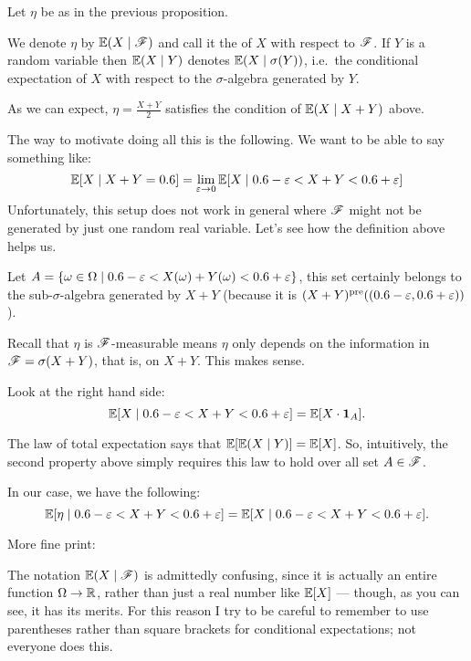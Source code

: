 \begin{definition}
	Let $\eta$ be as in the previous proposition.
	\begin{itemize}
		\ii We denote $\eta$ by $\mathbb E(X \mid \mathscr F)$
		and call it the  of $X$ with respect to $\mathscr F$.
		\ii If $Y$ is a random variable then
		$\mathbb E(X \mid Y)$ denotes $\mathbb E(X \mid \sigma(Y))$,
		i.e.\ the conditional expectation of $X$
		with respect to the $\sigma$-algebra generated by $Y$.
	\end{itemize}
\end{definition}

\begin{example}
	As we can expect, $\eta = \frac{X+Y}{2}$ satisfies the condition of $\mathbb E(X \mid X+Y)$ above.

	The way to motivate doing all this is the following. We want to be able to say
	something like:
	\[ \mathbb E[X \mid X+Y=0.6] = \lim_{\varepsilon \to 0} \mathbb E[X \mid 0.6-\varepsilon < X+Y < 0.6+\varepsilon] \]
	Unfortunately, this setup does not work in general where $\mathscr F$ might not be
	generated by just one random real variable.
	Let's see how the definition above helps us.
	\begin{itemize}
		\ii Let $A = \{\omega \in \Omega \mid 0.6-\varepsilon < X(\omega)+Y(\omega) < 0.6+\varepsilon\}$,
		this set certainly belongs to the sub-$\sigma$-algebra generated by $X+Y$
		(because it is $(X+Y)^{\text{pre}}((0.6-\varepsilon, 0.6+\varepsilon))$).

		\ii Recall that $\eta$ is $\mathscr F$-measurable means $\eta$ only depends on the information in
		$\mathscr F = \sigma(X+Y)$, that is, on $X+Y$. This makes sense.

		\ii Look at the right hand side:
		\[ \mathbb E[X \mid 0.6-\varepsilon < X+Y < 0.6+\varepsilon] = \mathbb E[X \cdot \mathbf{1}_A]. \]

		The law of total expectation says that $\mathbb E[\mathbb E(X \mid Y)] = \mathbb E[X]$.
		So, intuitively, the second property above simply requires
		this law to hold over all set $A \in \mathscr F$.

		In our case, we have the following:
		\[ \mathbb E[\eta \mid 0.6-\varepsilon < X+Y < 0.6+\varepsilon] = \mathbb E[X \mid 0.6-\varepsilon < X+Y < 0.6+\varepsilon]. \]
	\end{itemize}
\end{example}

More fine print:
\begin{remark}
	The notation $\mathbb E(X \mid \mathscr F)$ is admittedly confusing,
	since it is actually an entire function $\Omega \to \mathbb R$,
	rather than just a real number like $\mathbb E[X]$ --- though, as you can see, it has its merits.
	For this reason I try to be careful to remember
	to use parentheses rather than square brackets
	for conditional expectations; not everyone does this.
\end{remark}


